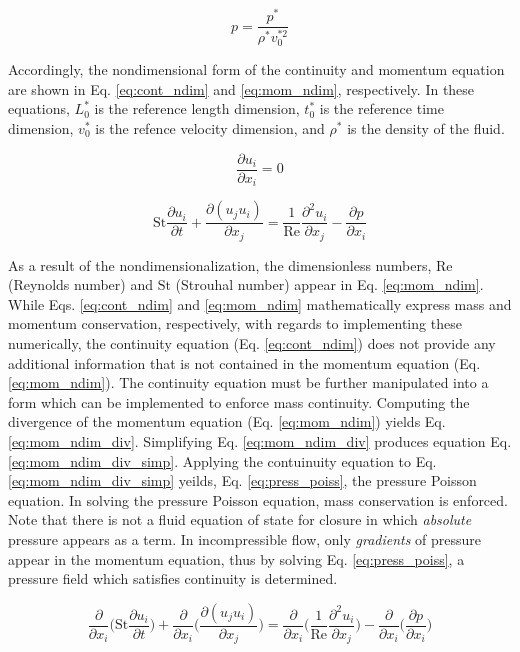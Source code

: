 \documentclass[10pt, letterpaper]{article}
\begin{document}
\begin{equation}
  p = \frac{p^{*}}{\rho^{*}v_{0}^{*2}}
  \label{eq:press_ndim}
\end{equation}

Accordingly, the nondimensional form of the continuity and momentum equation are shown in Eq. \ref{eq:cont_ndim} and \ref{eq:mom_ndim}, respectively. In these equations, $L_{0}^{*}$ is the reference length dimension, $t_{0}^{*}$ is the reference time dimension, $v_{0}^{*}$ is the refence velocity dimension, and $\rho^{*}$ is the density of the fluid.

\begin{equation}
  \frac{\partial{u_{i}}}{\partial{x_{i}}} = 0
  \label{eq:cont_ndim}
\end{equation}

\begin{equation}
  \boxed{
  \text{St}\frac{\partial{u_{i}}}{\partial{t}} + \frac{\partial{(u_{j}u_{i})}}{\partial{x_{j}}} =\frac{1}{\text{Re}}\frac{\partial^{2}{u_{i}}}{\partial{x_{j}}} - \frac{\partial{p}}{\partial{x_{i}}}
  \label{eq:mom_ndim}
  }
\end{equation}

As a result of the nondimensionalization, the dimensionless numbers, $\text{Re}$ (Reynolds number) and $\text{St}$ (Strouhal number) appear in Eq. \ref{eq:mom_ndim}. While Eqs. \ref{eq:cont_ndim} and \ref{eq:mom_ndim} mathematically express mass and momentum conservation, respectively, with regards to implementing these numerically, the continuity equation (Eq. \ref{eq:cont_ndim}) does not provide any additional information that is not contained in the momentum equation (Eq. \ref{eq:mom_ndim}). The continuity equation must be further manipulated into a form which can be implemented to enforce mass continuity. Computing the divergence of the momentum equation (Eq. \ref{eq:mom_ndim}) yields Eq. \ref{eq:mom_ndim_div}. Simplifying Eq. \ref{eq:mom_ndim_div} produces equation Eq. \ref{eq:mom_ndim_div_simp}. Applying the contuinuity equation to Eq. \ref{eq:mom_ndim_div_simp} yeilds, Eq. \ref{eq:press_poiss}, the pressure Poisson equation. In solving the pressure Poisson equation, mass conservation is enforced. Note that there is not a fluid equation of state for closure in which \textit{absolute} pressure appears as a term. In incompressible flow, only \textit{gradients} of pressure appear in the momentum equation, thus by solving Eq. \ref{eq:press_poiss}, a pressure field which satisfies continuity is determined.

\begin{equation}
  \frac{\partial}{\partial{x_{i}}}\bigg(\text{St}\frac{\partial{u_{i}}}{\partial{t}}\bigg) + \frac{\partial}{\partial{x_{i}}}\bigg(\frac{\partial{(u_{j}u_{i})}}{\partial{x_{j}}}\bigg) =\frac{\partial}{\partial{x_{i}}}\bigg(\frac{1}{\text{Re}}\frac{\partial^{2}{u_{i}}}{\partial{x_{j}}}\bigg) -\frac{\partial}{\partial{x_{i}}}\bigg(\frac{\partial{p}}{\partial{x_{i}}}\bigg)
  \label{eq:mom_ndim_div}
\end{equation}
\end{document}

